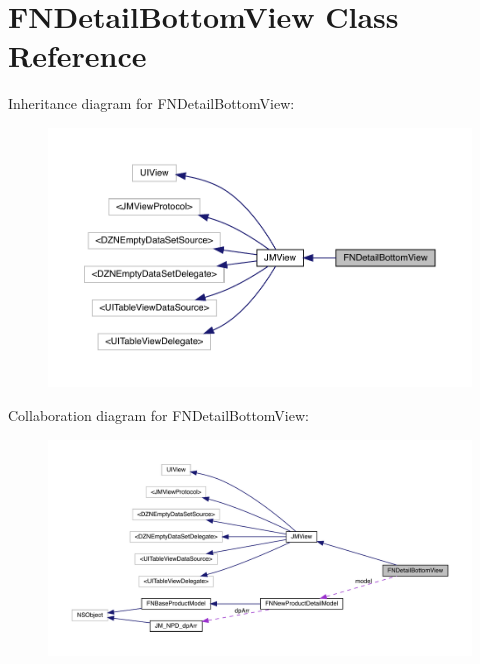 \hypertarget{interface_f_n_detail_bottom_view}{}\section{F\+N\+Detail\+Bottom\+View Class Reference}
\label{interface_f_n_detail_bottom_view}


Inheritance diagram for F\+N\+Detail\+Bottom\+View\+:\nopagebreak
\begin{figure}[H]
\begin{center}
\leavevmode
\includegraphics[width=350pt]{interface_f_n_detail_bottom_view__inherit__graph}
\end{center}
\end{figure}


Collaboration diagram for F\+N\+Detail\+Bottom\+View\+:\nopagebreak
\begin{figure}[H]
\begin{center}
\leavevmode
\includegraphics[width=350pt]{interface_f_n_detail_bottom_view__coll__graph}
\end{center}
\end{figure}
